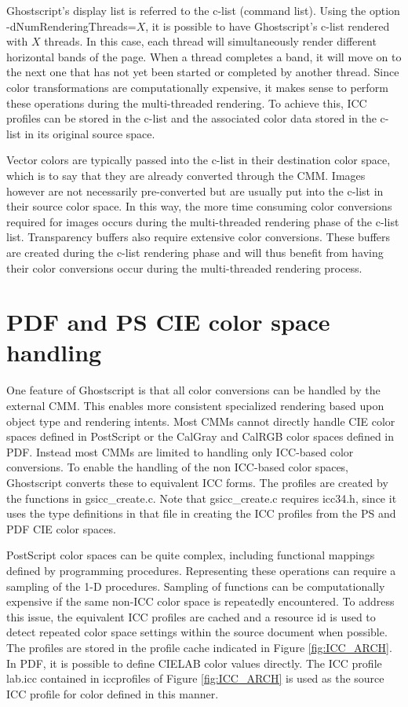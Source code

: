 \documentclass[12pt,notitlepage]{article}
\begin{document}
Ghostscript's display list is referred to the c-list (command list).  Using the option\\ -dNumRenderingThreads=$X$, it is possible to have Ghostscript's c-list rendered with $X$ threads.  In this case, each thread will simultaneously render different horizontal bands of the page.  When a thread completes a band, it will move on to the next one that has not yet been started or completed by another thread.
Since color transformations are computationally expensive, it makes sense to perform these operations during the multi-threaded rendering.  To achieve this, ICC profiles can be stored in the c-list and the associated color data stored in the c-list in its original source space.

Vector colors are typically passed into the c-list in their destination color space, which is to say that they are already converted through the CMM.  Images however are not necessarily pre-converted but are usually put into the c-list in their source color space.  In this way, the more time consuming color conversions required for images occurs during the multi-threaded rendering phase of the c-list list.  Transparency buffers also require extensive color conversions.  These buffers are created during the c-list rendering phase and will thus benefit from having their color conversions occur during the multi-threaded rendering process.

\section{PDF and PS CIE color space handling}

One feature of Ghostscript is that all color conversions can be handled by the external CMM.  This enables more consistent specialized rendering based upon object type and rendering intents.  Most CMMs cannot directly handle CIE color spaces defined in PostScript or the CalGray and CalRGB color spaces defined in PDF.  Instead most CMMs are limited to handling only ICC-based color conversions.  To enable the handling of the non ICC-based color spaces, Ghostscript converts these to equivalent ICC forms.   The profiles are created by the functions in gsicc\_create.c.  Note that gsicc\_create.c requires icc34.h, since it uses the type definitions in that file in creating the ICC profiles from the PS and PDF CIE color spaces.

PostScript color spaces can be quite complex, including functional mappings defined by programming procedures.  Representing these operations can require a sampling of the 1-D procedures.  Sampling of functions can be computationally expensive if the same non-ICC color space is repeatedly encountered.  To address this issue, the equivalent ICC profiles are cached and a resource id is used to detect repeated color space settings within the source document when possible.
The profiles are stored in the profile cache indicated in Figure \ref{fig:ICC_ARCH}.  In PDF, it is possible to define CIELAB color values directly.  The ICC profile lab.icc contained in iccprofiles of Figure \ref{fig:ICC_ARCH} is used as the source ICC profile for color defined in this manner.
\end{document}

